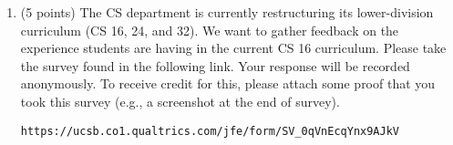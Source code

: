 \documentclass[
]{article}
\begin{document}
\begin{verbatim}
\end{verbatim}

\pagebreak

\begin{enumerate}
\def\labelenumi{\arabic{enumi}.}
\setcounter{enumi}{7}
\item
  (5 points) The CS department is currently restructuring its
  lower-division curriculum (CS 16, 24, and 32). We want to gather
  feedback on the experience students are having in the current CS 16
  curriculum. Please take the survey found in the following link. Your
  response will be recorded anonymously. To receive credit for this,
  please attach some proof that you took this survey (e.g., a screenshot
  at the end of survey).

  \texttt{https://ucsb.co1.qualtrics.com/jfe/form/SV\_0qVnEcqYnx9AJkV}
\end{enumerate}
\end{document}
